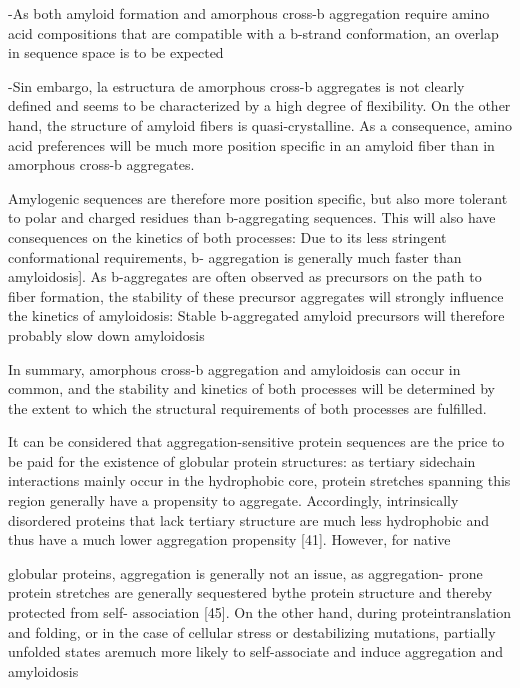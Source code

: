 -As both amyloid formation and amorphous cross-b aggregation require amino acid compositions that are compatible with a b-strand conformation, an overlap in
sequence space is to be expected

-Sin embargo, la estructura de amorphous cross-b aggregates is not
clearly defined and seems to be characterized by a high degree of flexibility. On the other hand, the structure of amyloid fibers is quasi-crystalline. As a consequence, amino acid preferences will be much more position specific in an amyloid fiber than in amorphous cross-b aggregates.

Amylogenic sequences are therefore more position specific, but also more tolerant to polar and charged residues than b-aggregating sequences. This will also have consequences on the kinetics of both processes: Due to its less stringent conformational requirements, b-
aggregation is generally much faster than amyloidosis]. 
As b-aggregates are often observed as precursors on the path to fiber formation, the stability of these precursor aggregates will strongly influence the kinetics of amyloidosis: Stable b-aggregated amyloid precursors will therefore probably slow down amyloidosis

In summary, amorphous cross-b aggregation and amyloidosis can occur in common, and the stability and kinetics of both processes will be determined by the extent to which the structural requirements of both processes are fulfilled.


It can be considered that aggregation-sensitive protein sequences are the price to be paid for the existence of globular protein structures: as tertiary sidechain interactions mainly occur in the hydrophobic core, protein stretches spanning this region generally have a propensity to aggregate. Accordingly, intrinsically disordered proteins that lack tertiary structure are much less hydrophobic and thus have a much lower aggregation propensity [41]. However, for native 

globular proteins, aggregation is generally not an issue, as aggregation- prone protein stretches are generally sequestered bythe protein structure and thereby protected from self-
association [45]. On the other hand, during proteintranslation and folding, or in the case of cellular stress or destabilizing mutations, partially unfolded states aremuch more likely to self-associate and induce aggregation and amyloidosis




